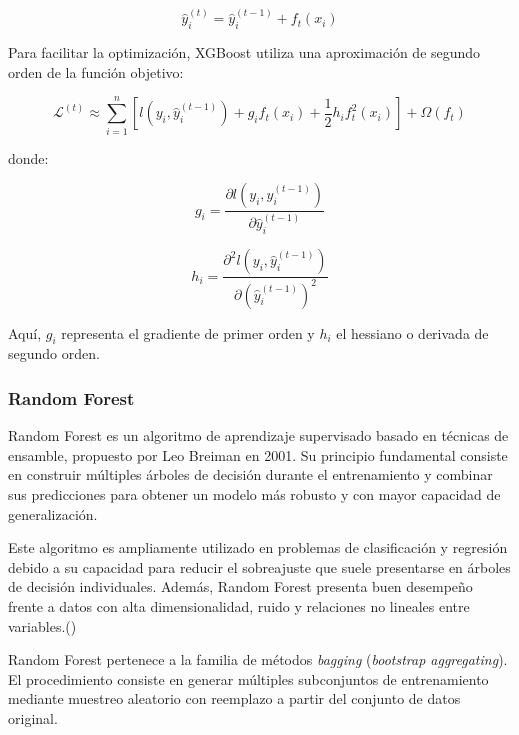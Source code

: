 \begin{equation}
\hat{y}_i^{(t)} = \hat{y}_i^{(t-1)} + f_t(x_i)
\end{equation}

Para facilitar la optimización, XGBoost utiliza una aproximación de segundo orden de la función objetivo:

\begin{equation}
\mathcal{L}^{(t)} \approx \sum_{i=1}^{n}
\left[
l(y_i,\hat{y}_i^{(t-1)})
+ g_i f_t(x_i)
+ \frac{1}{2} h_i f_t^2(x_i)
\right]
+ \Omega(f_t)
\end{equation}

donde:

\begin{equation}
g_i = \frac{\partial l(y_i,\hat{y}_i^{(t-1)})}{\partial \hat{y}_i^{(t-1)}}
\end{equation}

\begin{equation}
h_i = \frac{\partial^2 l(y_i,\hat{y}_i^{(t-1)})}{\partial (\hat{y}_i^{(t-1)})^2}
\end{equation}

Aquí, $g_i$ representa el gradiente de primer orden y $h_i$ el hessiano o derivada de segundo orden.



\subsubsection{Random Forest}

Random Forest es un algoritmo de aprendizaje supervisado basado en técnicas de ensamble, propuesto por Leo Breiman en 2001. Su principio fundamental consiste en construir múltiples árboles de decisión durante el entrenamiento y combinar sus predicciones para obtener un modelo más robusto y con mayor capacidad de generalización.

Este algoritmo es ampliamente utilizado en problemas de clasificación y regresión debido a su capacidad para reducir el sobreajuste que suele presentarse en árboles de decisión individuales. Además, Random Forest presenta buen desempeño frente a datos con alta dimensionalidad, ruido y relaciones no lineales entre variables.(\cite{breiman2001randomforest})


Random Forest pertenece a la familia de métodos \textit{bagging} (\textit{bootstrap aggregating}). El procedimiento consiste en generar múltiples subconjuntos de entrenamiento mediante muestreo aleatorio con reemplazo a partir del conjunto de datos original.

